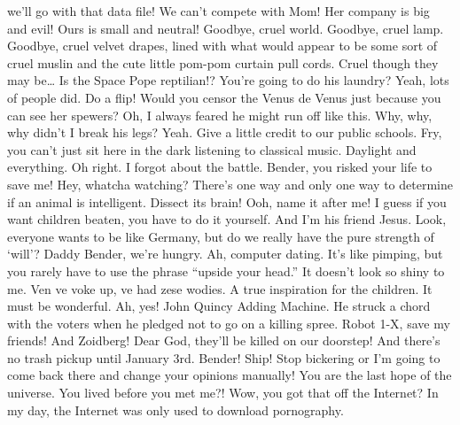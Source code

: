 we'll go with that data file! We can't compete with Mom! Her company is
big and evil! Ours is small and neutral! Goodbye, cruel world. Goodbye,
cruel lamp. Goodbye, cruel velvet drapes, lined with what would appear
to be some sort of cruel muslin and the cute little pom-pom curtain pull
cords. Cruel though they may be\ldots{} Is the Space Pope reptilian!?
You're going to do his laundry? Yeah, lots of people did. Do a flip!
Would you censor the Venus de Venus just because you can see her
spewers? Oh, I always feared he might run off like this. Why, why, why
didn't I break his legs? Yeah. Give a little credit to our public
schools. Fry, you can't just sit here in the dark listening to classical
music. Daylight and everything. Oh right. I forgot about the battle.
Bender, you risked your life to save me! Hey, whatcha watching? There's
one way and only one way to determine if an animal is intelligent.
Dissect its brain! Ooh, name it after me! I guess if you want children
beaten, you have to do it yourself. And I'm his friend Jesus. Look,
everyone wants to be like Germany, but do we really have the pure
strength of `will'? Daddy Bender, we're hungry. Ah, computer dating.
It's like pimping, but you rarely have to use the phrase ``upside your
head.'' It doesn't look so shiny to me. Ven ve voke up, ve had zese
wodies. A true inspiration for the children. It must be wonderful. Ah,
yes! John Quincy Adding Machine. He struck a chord with the voters when
he pledged not to go on a killing spree. Robot 1-X, save my friends! And
Zoidberg! Dear God, they'll be killed on our doorstep! And there's no
trash pickup until January 3rd. Bender! Ship! Stop bickering or I'm
going to come back there and change your opinions manually! You are the
last hope of the universe. You lived before you met me?! Wow, you got
that off the Internet? In my day, the Internet was only used to download
pornography.



